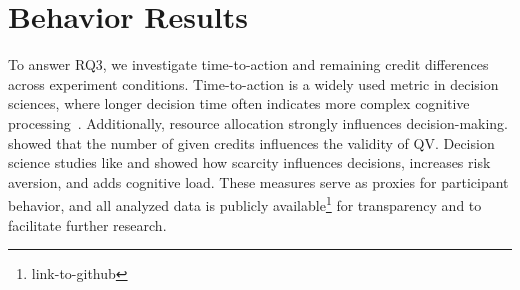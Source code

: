 \section{Behavior Results}
\label{sec:behave_result}
To answer RQ3, we investigate time-to-action and remaining credit differences across experiment conditions. Time-to-action is a widely used metric in decision sciences, where longer decision time often indicates more complex cognitive processing~\cite{payneAdaptiveDecisionMaker1993}. Additionally, resource allocation strongly influences decision-making. \textcite{chengCanShowWhat2021} showed that the number of given credits influences the validity of QV. Decision science studies like \textcite{Shah2015a} and \cite{debruijnPovertyEconomicDecision2022} showed how scarcity influences decisions, increases risk aversion, and adds cognitive load. These measures serve as proxies for participant behavior, and all analyzed data is publicly available\footnote{link-to-github} for transparency and to facilitate further research.

\newsavebox{\savefig}

